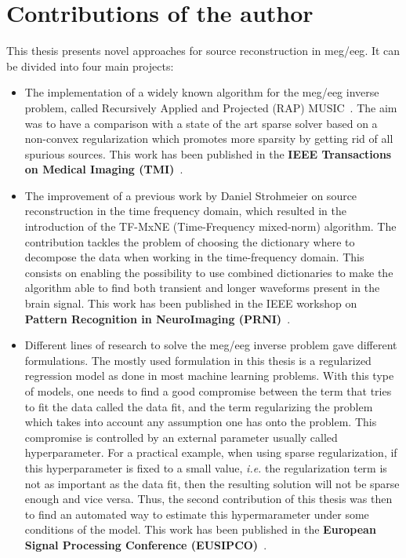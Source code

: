 \section{Contributions of the author}
This thesis presents novel approaches for source reconstruction in \ac{meg}/\ac{eeg}. It can be divided into four main projects:
\begin{itemize}
\item The implementation of a widely known algorithm for the \ac{meg}/\ac{eeg} inverse problem, called Recursively Applied and Projected (RAP) MUSIC~\cite{mosher-leahy:1999}. The aim was to have a comparison with a state of the art sparse solver based on a non-convex regularization which promotes more sparsity by getting rid of all spurious sources. This work has been published in the \textbf{IEEE Transactions on Medical Imaging (TMI)}~\cite{strohmeier-etal:16}.

\item The improvement of a previous work by Daniel Strohmeier on source reconstruction in the time frequency domain, which resulted in the introduction of the TF-MxNE  (Time-Frequency mixed-norm) algorithm. The contribution tackles the problem of choosing the dictionary where to decompose the data when working in the time-frequency domain. This consists on enabling the possibility to use combined dictionaries to make the algorithm able to find both transient and longer waveforms present in the brain signal. This work has been published in the IEEE workshop on \textbf{Pattern Recognition in NeuroImaging (PRNI)}~\cite{bekhti2016m}.

\item Different lines of research to solve the \ac{meg}/\ac{eeg} inverse problem gave different formulations. The mostly used formulation in this thesis is a regularized regression model as done in most machine learning problems. With this type of models, one needs to find a good compromise between the term that tries to fit the data called the data fit, and the term regularizing the problem which takes into account any assumption one has onto the problem. This compromise is controlled by an external parameter usually called hyperparameter. For a practical example, when using sparse regularization, if this hyperparameter is fixed to a small value, \textit{i.e.} the regularization term is not as important as the data fit, then the resulting solution will not be sparse enough and vice versa. Thus, the second contribution of this thesis was then to find an automated way to estimate this hypermarameter under some conditions of the model. This work has been published in the \textbf{European Signal Processing Conference (EUSIPCO)}~\cite{bekhti_eusipco}.


\end{itemize}
